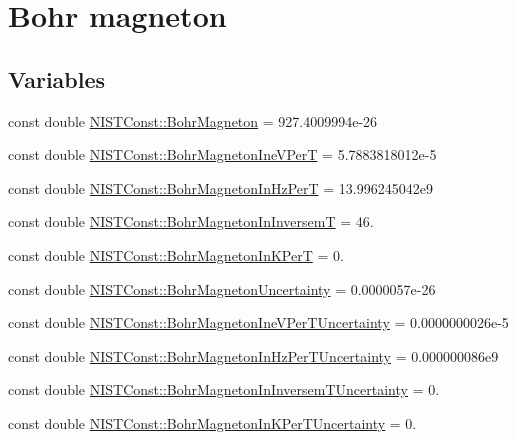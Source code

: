 \hypertarget{group___bohr_magneton}{}\section{Bohr magneton}
\label{group___bohr_magneton}
\subsection*{Variables}
\begin{DoxyCompactItemize}
\item 
const double \hyperlink{group___bohr_magneton_gaace59be8951a23257cedcbef8f320c66}{N\+I\+S\+T\+Const\+::\+Bohr\+Magneton} = 927.\+4009994e-\/26
\item 
const double \hyperlink{group___bohr_magneton_ga8b97d10b13a2c5de4f0d268370bc3c50}{N\+I\+S\+T\+Const\+::\+Bohr\+Magneton\+Ine\+V\+PerT} = 5.\+7883818012e-\/5
\item 
const double \hyperlink{group___bohr_magneton_ga0c3cc268d0e1abc4703ea8f2c11ccab8}{N\+I\+S\+T\+Const\+::\+Bohr\+Magneton\+In\+Hz\+PerT} = 13.\+996245042e9
\item 
const double \hyperlink{group___bohr_magneton_ga5d2bdfa6451f3966c0e4ce0d76da7880}{N\+I\+S\+T\+Const\+::\+Bohr\+Magneton\+In\+InversemT} = 46.
\item 
const double \hyperlink{group___bohr_magneton_ga4fcb81eff2823748ae5fced898ecc0ec}{N\+I\+S\+T\+Const\+::\+Bohr\+Magneton\+In\+K\+PerT} = 0.
\item 
const double \hyperlink{group___bohr_magneton_gaf2591aab0321fec9056cc1a8479cb05b}{N\+I\+S\+T\+Const\+::\+Bohr\+Magneton\+Uncertainty} = 0.\+0000057e-\/26
\item 
const double \hyperlink{group___bohr_magneton_gaaecd1151f7f9e12288a05ba80fb94bbd}{N\+I\+S\+T\+Const\+::\+Bohr\+Magneton\+Ine\+V\+Per\+T\+Uncertainty} = 0.\+0000000026e-\/5
\item 
const double \hyperlink{group___bohr_magneton_ga6bbb08744c1f404415a645e006c75a0b}{N\+I\+S\+T\+Const\+::\+Bohr\+Magneton\+In\+Hz\+Per\+T\+Uncertainty} = 0.\+000000086e9
\item 
const double \hyperlink{group___bohr_magneton_ga9aca7b3ac1fac66baa5e4b05281ac5d4}{N\+I\+S\+T\+Const\+::\+Bohr\+Magneton\+In\+Inversem\+T\+Uncertainty} = 0.
\item 
const double \hyperlink{group___bohr_magneton_ga25a3b7882df7b01e29f7d0ec090a6f91}{N\+I\+S\+T\+Const\+::\+Bohr\+Magneton\+In\+K\+Per\+T\+Uncertainty} = 0.
\item 

\end{DoxyCompactItemize}
